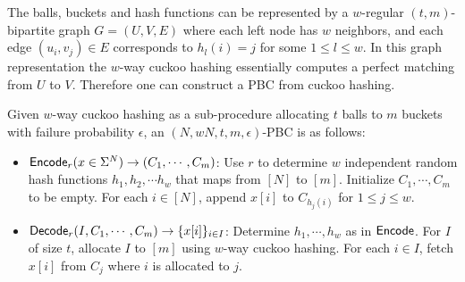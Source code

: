 The balls, buckets and hash functions can be represented by a $w$-regular $(t,m)$-bipartite graph $G=(U,V,E)$ where each left node has $w$ neighbors, and each edge $(u_i,v_j)\in E$ corresponds to $h_l(i)=j$ for some $1\le l\le w$. In this graph representation the $w$-way cuckoo hashing essentially computes a perfect matching from $U$ to $V$. Therefore one can construct a PBC from cuckoo hashing. 

\begin{construction}
  Given $w$-way cuckoo hashing as a sub-procedure allocating $t$ balls to $m$ buckets with failure probability $\epsilon$, an $(N,wN,t,m,\epsilon)$-PBC is as follows: 
  \begin{itemize}
    \item ${\sf Encode}_r(x\in\Sigma^N)\rightarrow (C_1,\cdots,C_m)$: Use $r$ to determine $w$ independent random hash functions $h_1,h_2,\cdots h_w$ that maps from $[N]$ to $[m]$. Initialize $C_1,\cdots,C_m$ to be empty. For each $i\in[N]$, append $x[i]$ to $C_{h_j(i)}$ for $1\le j\le w$. 
    \item ${\sf Decode}_r(I, C_1,\cdots, C_m)\rightarrow \{x[i]\}_{i\in I}$: Determine $h_1,\cdots, h_w$ as in ${\sf Encode}$. For $I$ of size $t$, allocate $I$ to $[m]$ using $w$-way cuckoo hashing. For each $i\in I$, fetch $x[i]$ from $C_j$ where $i$ is allocated to $j$. 
  \end{itemize}
\end{construction}
